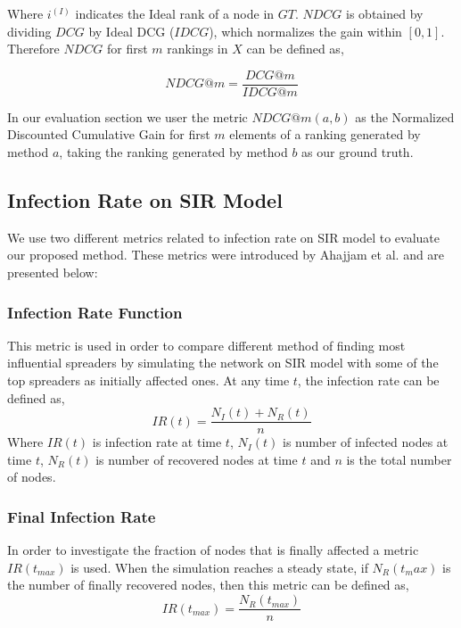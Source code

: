 \documentclass[sigconf]{acmart}
\begin{document}
Where $i^{(I)}$ indicates the Ideal rank of a node in $GT$. $NDCG$ is obtained by dividing $DCG$ by Ideal DCG ($IDCG$), which normalizes the gain within $[0,1]$. Therefore $NDCG$ for first  $m$ rankings in $X$ can be defined as,
	
\begin{equation}
NDCG@m = \frac{DCG@m}{IDCG@m}
\end{equation}

In our evaluation section we user the metric $NDCG@m(a,b)$ as the Normalized Discounted Cumulative Gain for first $m$ elements of a ranking generated by method $a$, taking the ranking generated by method $b$ as our ground truth.

\subsection{Infection Rate on SIR Model}
We use two different metrics related to infection rate on SIR model to evaluate our proposed method. These metrics were introduced by Ahajjam et al. \cite{ahajjam2018identification} and are presented below:

\subsubsection{Infection Rate Function}
This metric is used in order to compare different method of finding most influential spreaders by simulating the network on SIR model with some of the top spreaders as initially affected ones. At any time $t$, the infection rate can be defined as,
\begin{equation}
IR(t) = \dfrac{N_I(t)+N_R(t)}{n}
\label{infection rate eq}
\end{equation}
Where $IR(t)$ is infection rate at time $t$, $N_I(t)$ is number of infected nodes at time $t$, $N_R(t)$ is number of recovered nodes at time $t$ and $n$ is the total number of nodes.
 
\subsubsection{Final Infection Rate}
In order to investigate the fraction of nodes that is finally affected a metric $IR(t_{max})$ is used. When the simulation reaches a steady state, if $N_R(t_max)$ is the number of finally recovered nodes, then this metric can be defined as,
\begin{equation}
IR(t_{max}) = \dfrac{N_R(t_{max})}{n}
\label{infection rate eq}
\end{equation}
\end{document}
